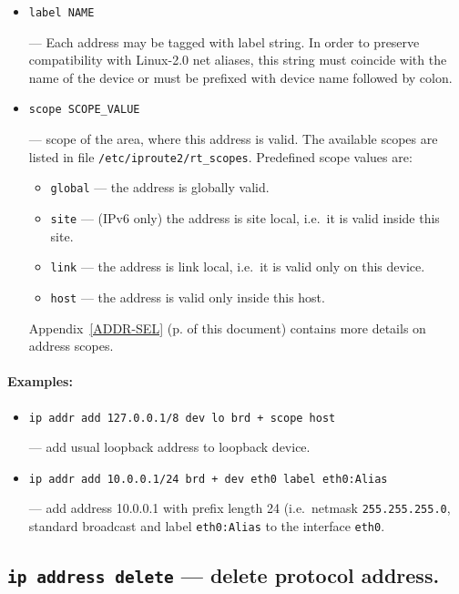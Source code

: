 \begin{itemize}
\item \verb|label NAME|

--- Each address may be tagged with label string.
In order to preserve compatibility with Linux-2.0 net aliases,
this string must coincide with the name of the device or must be prefixed
with device name followed by colon.


\item \verb|scope SCOPE_VALUE|

--- scope of the area, where this address is valid.
The available scopes are listed in file \verb|/etc/iproute2/rt_scopes|.
Predefined scope values are:

 \begin{itemize}
	\item \verb|global| --- the address is globally valid.
	\item \verb|site| --- (IPv6 only) the address is site local,
	i.e.\ it is valid inside this site.
	\item \verb|link| --- the address is link local, i.e.\ 
	it is valid only on this device.
	\item \verb|host| --- the address is valid only inside this host.
 \end{itemize}

Appendix~\ref{ADDR-SEL} (p.\pageref{ADDR-SEL} of this document)
contains more details on address scopes.

\end{itemize}

\paragraph{Examples:}
\begin{itemize}
\item \verb|ip addr add 127.0.0.1/8 dev lo brd + scope host|

--- add usual loopback address to loopback device.

\item \verb|ip addr add 10.0.0.1/24 brd + dev eth0 label eth0:Alias|

--- add address 10.0.0.1 with prefix length 24 (i.e.\ netmask
\verb|255.255.255.0|, standard broadcast and label \verb|eth0:Alias|
to the interface \verb|eth0|.
\end{itemize}


\subsection{{\tt ip address delete} --- delete protocol address.}

